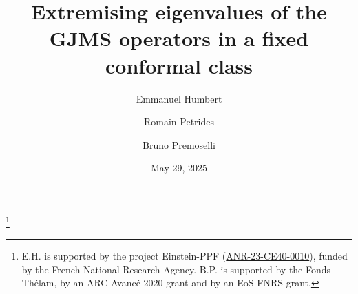 \documentclass[10pt]{amsart}
\numberwithin{equation}{section}
\theoremstyle{plain}
\theoremstyle{remark}
\begin{document}
\title[Extremising eigenvalues of the GJMS operators]{Extremising eigenvalues of the GJMS operators in a fixed conformal class}


\author{Emmanuel Humbert}

\address{Emmanuel Humbert, LMPT CNRS UMR 6083, Facult\'e des Sciences et Techniques Univerist\'e Fran\c{c}ois Rabelais, Parc de Grandmont 37200 Tours, France}


\author{Romain Petrides}

\address{Romain Petrides, IMJ-PRG, Universit\'e Paris Cit\'e, B\^atiment Sophie Germain 75205 Paris Cedex 13, France}


\author{Bruno Premoselli}

\address{Bruno Premoselli, Universit\'e Libre de Bruxelles, Service d'analyse, CP 218, Boulevard du Triomphe, B-1050 Bruxelles, Belgique}


\thanks{E.H. is supported by the project Einstein-PPF (\href{https://anr.fr/Project-ANR-23-CE40-0010}{ANR-23-CE40-0010}), funded by the French National Research Agency. 
B.P. is supported by the Fonds Th\'elam, by an ARC Avanc\'e 2020 grant and by an EoS FNRS grant.}

\date{May 29, 2025}



 
\end{document}
